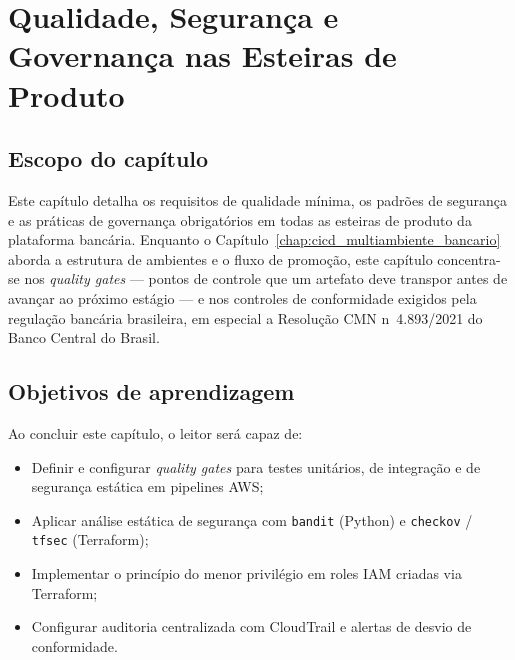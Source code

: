 \chapter{Qualidade, Seguran\c{c}a e Governan\c{c}a nas Esteiras de Produto}
\label{chap:qualidade_seguranca_esteiras}

\section{Escopo do cap\'itulo}

Este cap\'itulo detalha os requisitos de qualidade m\'inima, os padr\~oes de
seguran\c{c}a e as pr\'aticas de governan\c{c}a
obrigat\'orios em todas as esteiras de produto da plataforma banc\'aria. Enquanto
o Cap\'itulo~\ref{chap:cicd_multiambiente_bancario} aborda a estrutura de
ambientes e o fluxo de promo\c{c}\~ao, este cap\'itulo concentra-se nos
\textit{quality gates} --- pontos de controle que
um artefato deve transpor antes de avan\c{c}ar ao pr\'oximo est\'agio ---
e nos controles de conformidade exigidos pela regula\c{c}\~ao banc\'aria
brasileira, em especial a Resolu\c{c}\~ao CMN n\textordmasculine~4.893/2021
do Banco Central do Brasil.

\section{Objetivos de aprendizagem}

Ao concluir este cap\'itulo, o leitor ser\'a capaz de:

\begin{itemize}[leftmargin=*]
  \item Definir e configurar \textit{quality gates} para testes unit\'arios,
        de integra\c{c}\~ao e de seguran\c{c}a est\'atica em pipelines AWS;
  \item Aplicar an\'alise est\'atica de seguran\c{c}a com \texttt{bandit}
        (Python) e \texttt{checkov} / \texttt{tfsec} (Terraform);
  \item Implementar o princ\'ipio do menor privil\'egio
        em roles IAM criadas via Terraform;
  \item Configurar auditoria centralizada com CloudTrail
        e alertas de desvio de conformidade.
\end{itemize}

